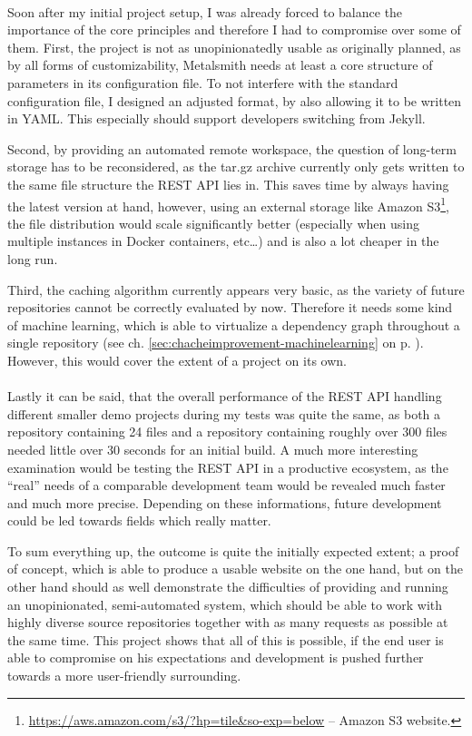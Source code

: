 \paragraph{}
Soon after my initial project setup, I was already forced to balance the importance of the core principles and therefore I had to compromise over some of them. First, the project is not as unopinionatedly usable as originally planned, as by all forms of customizability, Metalsmith needs at least a core structure of parameters in its configuration file. To not interfere with the standard configuration file, I designed an adjusted format, by also allowing it to be written in YAML. This especially should support developers switching from Jekyll.

Second, by providing an automated remote workspace, the question of long-term storage has to be reconsidered, as the tar.gz archive currently only gets written to the same file structure the REST API lies in. This saves time by always having the latest version at hand, however, using an external storage like Amazon S3\footnote{\url{https://aws.amazon.com/s3/?hp=tile&so-exp=below} -- Amazon S3 website.}, the file distribution would scale significantly better (especially when using multiple instances in Docker containers, etc\ldots) and is also a lot cheaper in the long run.

Third, the caching algorithm currently appears very basic, as the variety of future repositories cannot be correctly evaluated by now. Therefore it needs some kind of machine learning, which is able to virtualize a dependency graph throughout a single repository (see ch. \ref{sec:chacheimprovement-machinelearning} on p. \pageref{sec:chacheimprovement-machinelearning}). However, this would cover the extent of a project on its own.

\paragraph{}
Lastly it can be said, that the overall performance of the REST API handling different smaller demo projects during my tests was quite the same, as both a repository containing 24 files and a repository containing roughly over 300 files needed little over 30 seconds for an initial build. A much more interesting examination would be testing the REST API in a productive ecosystem, as the ``real'' needs of a comparable development team would be revealed much faster and much more precise. Depending on these informations, future development could be led towards fields which really matter.

To sum everything up, the outcome is quite the initially expected extent; a proof of concept, which is able to produce a usable website on the one hand, but on the other hand should as well demonstrate the difficulties of providing and running an unopinionated, semi-automated system, which should be able to work with highly diverse source repositories together with as many requests as possible at the same time. This project shows that all of this is possible, if the end user is able to compromise on his expectations and development is pushed further towards a more user-friendly surrounding.
